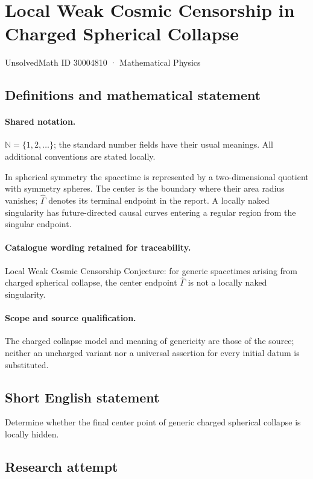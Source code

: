 \documentclass[11pt]{article}
\begin{document}
\setcounter{section}{30004809}
\section{Local Weak Cosmic Censorship in Charged Spherical Collapse}\label{30004810}
{\small UnsolvedMath ID 30004810 · Mathematical Physics}
\subsection{Definitions and mathematical statement}

\paragraph{Shared notation.}$\mathbb N=\{1,2,\ldots\}$; the standard number fields have their usual meanings. All additional conventions are stated locally.


In spherical symmetry the spacetime is represented by a two-dimensional quotient with symmetry spheres. The center is the boundary where their area radius vanishes; $\widehat\Gamma$ denotes its terminal endpoint in the report. A locally naked singularity has future-directed causal curves entering a regular region from the singular endpoint.

\paragraph{Catalogue wording retained for traceability.}
Local Weak Cosmic Censorship Conjecture: for generic spacetimes arising from charged spherical collapse, the center endpoint $\widehat{\Gamma}$ is not a locally naked singularity.

\paragraph{Scope and source qualification.}The charged collapse model and meaning of genericity are those of the source; neither an uncharged variant nor a universal assertion for every initial datum is substituted.
\subsection{Short English statement}
Determine whether the final center point of generic charged spherical collapse is locally hidden.
\subsection{Research attempt}
\end{document}
